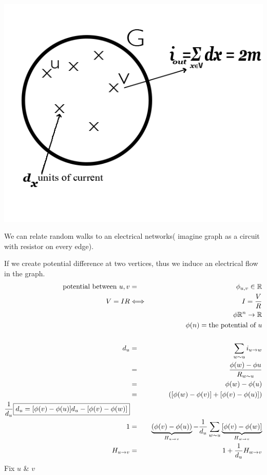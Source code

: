 \documentclass[12pt]{article}
\begin{document}
\begin{center}
\\
\includegraphics{Gcirc.png}
\end{center}
We can relate random walks to an electrical networks( imagine graph as a circuit with resistor on every edge).

If we create potential difference at two vertices, thus we induce an electrical flow in the graph.
\begin{eqnarray*}
	\text{potential between } u,v &=&\phi_{u,v} \in \mathbb{R}\\
	V = IR &\Longleftrightarrow& I = \frac{V}{R}\\
	&& \phi \mathbb{R}^n \to \mathbb{R}\\
	&& \phi(n) = \text{the potential of } u\\\\
	d_u &=& \sum_{w\sim u} i_{u \to w}\\
	&=& \frac{\phi(w) - \phi{u}}{R_{w\sim u}}\\
	&=& \phi(w) - \phi(u)\\
	&=& ([\phi(w) - \phi(v) ] + [\phi(v) - \phi(u) ])\\
	\frac{1}{d_u} \fbox{$d_u = [\phi(v) - \phi(u) ]d_u - [\phi(v) - \phi(w) ]$}\\
	1 &=& \underbrace{(\phi(v) - \phi(u) )}_{H_{u \to v}} - \frac{1}{d_u} \sum_{w\sim u} \underbrace{[\phi(v) - \phi(w)]}_{H_{w \to v}}\\
	H_{u\to v} &=& 1+ \frac{1}{d_u}H_{w\to v}
\end{eqnarray*}
Fix $u$ \& $v$\\
\end{document}
